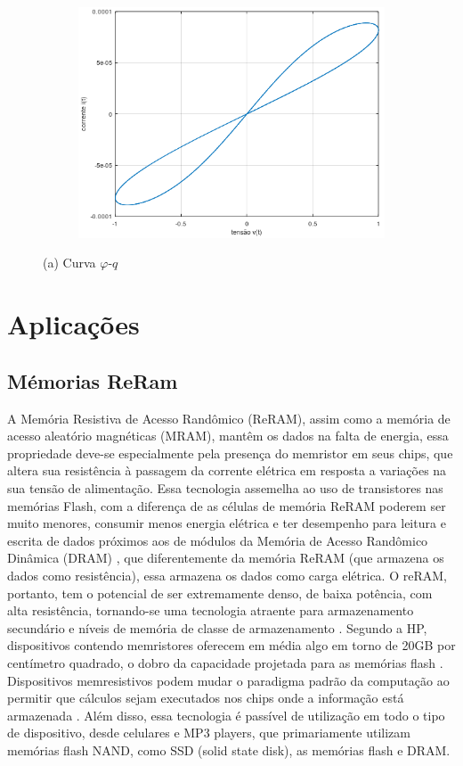 \documentclass{ceel}
\begin{document}
\begin{multicols}{2}
\begin{figure}[ht]
\begin{subfigure}{0.33\textwidth}
\includegraphics[width=\columnwidth]{w0}
\caption{} \label{-}
\end{subfigure}

\caption{(a) Curva $\varphi$-$q$}\label{}
\end{figure}



\section{Aplicações}\label{aplicacoes}
\subsection{Mémorias ReRam}
A Memória Resistiva de Acesso Randômico (ReRAM), assim como a memória de acesso aleatório magnéticas (MRAM), mantêm os dados na falta de energia, essa propriedade deve-se especialmente pela presença do memristor em seus chips, que altera sua resistência à passagem da corrente elétrica em resposta a variações na sua tensão de alimentação.
Essa tecnologia assemelha ao uso de transistores nas memórias Flash, com a diferença de as células de memória ReRAM poderem ser muito menores, consumir menos energia elétrica e ter desempenho para leitura e escrita de dados próximos aos de módulos da Memória de Acesso Randômico Dinâmica (DRAM)\cite{blog} , que diferentemente da memória ReRAM (que armazena os dados como resistência), essa armazena os dados como carga elétrica.
O reRAM, portanto, tem o potencial de ser extremamente denso, de baixa potência, com alta resistência, tornando-se uma tecnologia atraente para armazenamento secundário e níveis de memória de classe de armazenamento \cite{prog}. Segundo a HP, dispositivos contendo memristores oferecem em média algo em torno de 20GB por centímetro quadrado, o dobro da capacidade projetada para as memórias flash \cite{hp}.
Dispositivos memresistivos podem mudar o paradigma padrão da computação ao permitir que cálculos sejam executados nos chips onde a informação está armazenada \cite{hp}. Além disso, essa tecnologia é passível de utilização em todo o tipo de dispositivo, desde celulares e MP3 players, que primariamente utilizam memórias flash NAND, como SSD (solid state disk), as memórias flash e DRAM.


\end{multicols}
\end{document}
